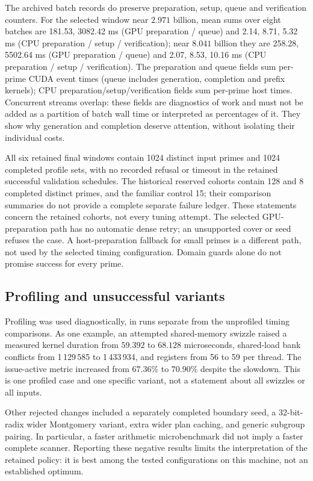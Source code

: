 \documentclass[11pt]{article}
\theoremstyle{definition}\newtheorem{remark}[theorem]{Remark}
\begin{document}
The archived batch records do preserve preparation, setup, queue and
verification counters. For the selected window near $2.971$ billion,
mean sums over eight batches are 181.53, 3082.42 ms (GPU preparation / queue) and 2.14, 8.71, 5.32 ms (CPU preparation / setup / verification); near
$8.041$ billion they are 258.28, 5502.64 ms (GPU preparation / queue) and 2.07, 8.53, 10.16 ms (CPU preparation / setup / verification). The preparation
and queue fields sum per-prime CUDA event times (queue includes generation,
completion and prefix kernels); CPU preparation/setup/verification fields
sum per-prime host times. Concurrent streams overlap: these fields are
diagnostics of work and must not be added as a partition of batch wall
time or interpreted as percentages of it. They show why generation and
completion deserve attention, without isolating their individual costs.

All six retained final windows contain 1024 distinct input primes and 1024
completed profile sets, with no recorded refusal or timeout in the
retained successful validation schedules. The historical reserved cohorts
contain 128 and 8 completed distinct primes, and the familiar control 15;
their comparison summaries do not provide a complete separate failure
ledger. These statements concern the retained cohorts, not every tuning
attempt. The selected GPU-preparation path has no automatic dense retry;
an unsupported cover or seed refuses the case. A host-preparation fallback
for small primes is a different path, not used by the selected timing
configuration. Domain guards alone do not promise success for every prime.

\subsection{Profiling and unsuccessful variants}
Profiling was used diagnostically, in runs separate from the unprofiled
timing comparisons. As one example, an attempted shared-memory swizzle
raised a measured kernel duration from $59.392$ to $68.128$ microseconds,
shared-load bank conflicts from 1\,129\,585 to 1\,433\,934, and registers
from 56 to 59 per thread. The issue-active metric increased from $67.36\%$
to $70.90\%$ despite the slowdown. This is one profiled case and one
specific variant, not a statement about all swizzles or all inputs.

Other rejected changes included a separately completed boundary seed, a
32-bit-radix wider Montgomery variant, extra wider plan caching, and
generic subgroup pairing. In particular, a faster arithmetic microbenchmark
did not imply a faster complete scanner. Reporting these negative results
limits the interpretation of the retained policy: it is best among the
tested configurations on this machine, not an established optimum.
\end{document}
